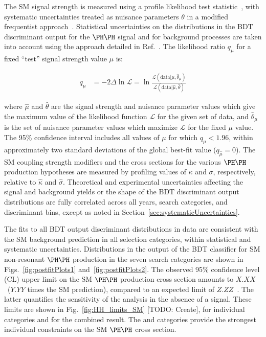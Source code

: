 The SM signal strength is measured using a profile likelihood test
statistic~\cite{Cowan:2010js}, with systematic uncertainties treated as nuisance
parameters $\theta$ in a modified frequentist approach~\cite{ATL-PHYS-PUB-2011-011}.
Statistical uncertainties on the distributions in the BDT discriminant output for the $\HH$ signal and for background processes
are taken into account using the approach detailed in Ref.~\cite{Barlow:1993dm}.
The likelihood ratio $q_{\mu}$ for a fixed ``test'' signal strength value $\mu$ is:
\begin{linenomath}
\begin{equation*}
  \begin{aligned}
    q_{\mu}  &  = -2 \Delta \ln \mathcal{L} = \ln \frac{\mathcal{L}(\mathrm{data}|\mu,\hat{\theta}_{\mu})}{\mathcal{L}(\mathrm{data}|\hat{\mu},\hat{\theta})}
  \end{aligned}
\end{equation*}
\end{linenomath}
where $\hat{\mu}$ and $\hat{\theta}$ are the signal strength and nuisance
parameter values which give the maximum value of the likelihood function $\mathcal{L}$
for the given set of data, and $\hat{\theta}_{\mu}$ is the set of nuisance
parameter values which maximize $\mathcal{L}$ for the fixed $\mu$ value.
The 95\% confidence interval includes all values of $\mu$ for which $q_{\mu} < 1.96$,
within approximately two standard deviations of the global best-fit value ($q_{\hat{\mu}} = 0$).
The SM coupling strength modifiers and the cross sections for the various $\HH$ production hypotheses
are measured by profiling values of $\kappa$ and $\sigma$, respectively,
relative to $\hat{\kappa}$ and $\hat{\sigma}$.
Theoretical and experimental uncertainties affecting the signal and
background yields or the shape of the BDT discriminant output distributions are fully
correlated across all years, search categories, and discriminant bins,
except as noted in Section~\ref{sec:systematicUncertainties}.

The fits to all BDT output discriminant distributions in data are consistent with the
SM background prediction in all selection categories, within statistical and systematic uncertainties.
Distributions in the output of the BDT classifier for SM non-resonant $\HH$ production
in the seven search categories are shown in Figs.~\ref{fig:postfitPlots1} and~\ref{fig:postfitPlots2}.
The observed 95\% confidence level (CL) upper limit on the SM $\HH$ production cross section
amounts to $X.XX$~\pb ($Y.YY$ times the SM prediction), compared to an
expected limit of $Z.ZZ$~\pb.
The latter quantifies the sensitivity of the analysis in the absence of a signal.
These limits are shown in Fig.~\ref{fig:HH_limits_SM} [TODO: Create],
for individual categories and for the combined result.
The \lttt and \lllnot categories provide the strongest individual
constraints on the SM $\HH$ cross section.


